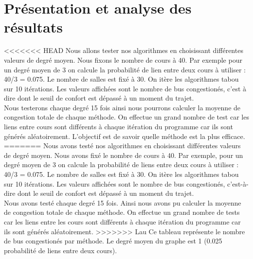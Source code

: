 \documentclass[a4paper,11pt]{article}
\begin{document}
\section{Présentation et analyse des résultats}
<<<<<<< HEAD
	Nous allons tester nos algorithmes en choisissant différentes valeurs de degré moyen. Nous fixons le nombre de cours à 40. Par exemple pour un degré moyen de 3 on calcule la probabilité de lien entre deux cours à utiliser : 40/3 = 0.075. Le nombre de salles est fixé à 30. On itère les algorithmes tabou sur 10 itérations. Les valeurs affichées sont le nombre de bus congestionés, c'est à dire dont le seuil de confort est dépassé à un moment du trajet.\\
	Nous testerons chaque degré 15 fois ainsi nous pourrons calculer la moyenne de congestion totale de chaque méthode. On effectue un grand nombre de test car les liens entre cours sont différents à chaque itération du programme car ils sont générés aléatoirement. L'objectif est de savoir quelle méthode est la plus efficace.
=======
	Nous avons testé nos algorithmes en choisissant différentes valeurs de degré moyen. Nous avons fixé le nombre de cours à 40. Par exemple, pour un degré moyen de 3 on calcule la probabilité de liens entre deux cours à utiliser : 40/3 = 0.075. Le nombre de salles est fixé à 30. On itère les algorithmes tabou sur 10 itérations. Les valeurs affichées sont le nombre de bus congestionés, c'est-à-dire dont le seuil de confort est dépassé à un moment du trajet.\\
	Nous avons testé chaque degré 15 fois. Ainsi nous avons pu calculer la moyenne de congestion totale de chaque méthode. On effectue un grand nombre de tests car les liens entre les cours sont différents à chaque itération du programme car ils sont générés aléatoirement.
>>>>>>> Lau
	\newpage
	Ce tableau représente le nombre de bus congestionés par méthode. Le degré moyen du graphe est 1 (0.025 probabilité de liens entre deux cours).\\ 
\end{document}
